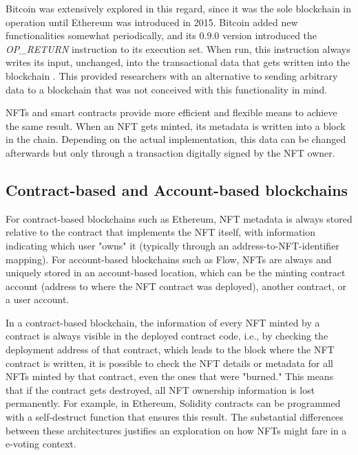 \documentclass[../main.tex]{subfiles}
\begin{document}
\par
Bitcoin was extensively explored in this regard, since it was the sole blockchain in operation until Ethereum was introduced in 2015. Bitcoin added new functionalities somewhat periodically, and its $ 0.9.0 $ version introduced the \textit{OP\_RETURN} instruction to its execution set. When run, this instruction always writes its input, unchanged, into the transactional data that gets written into the blockchain \cite{Bartoletti2017}. This provided researchers with an alternative to sending arbitrary data to a blockchain that was not conceived with this functionality in mind.
\par
NFTs and smart contracts provide more efficient and flexible means to achieve the same result. When an NFT gets minted, its metadata is written into a block in the chain. Depending on the actual implementation, this data can be changed afterwards but only through a transaction digitally signed by the NFT owner.

\subsection{Contract-based and Account-based blockchains}
\label{sec:contract-to-account-storage}
For contract-based blockchains such as Ethereum, NFT metadata is always stored relative to the contract that implements the NFT itself, with information indicating which user "owns" it (typically through an address-to-NFT-identifier mapping). For account-based blockchains such as Flow, NFTs are always and uniquely stored in an account-based location, which can be the minting contract account (address to where the NFT contract was deployed), another contract, or a user account.
\par
In a contract-based blockchain, the information of every NFT minted by a contract is always visible in the deployed contract code, i.e., by checking the deployment address of that contract, which leads to the block where the NFT contract is written, it is possible to check the NFT details or metadata for all NFTs minted by that contract, even the ones that were "burned." This means that if the contract gets destroyed, all NFT ownership information is lost permanently. For example, in Ethereum, Solidity contracts can be programmed with a self-destruct function that ensures this result. The substantial differences between these architectures justifies an exploration on how NFTs might fare in a e-voting context.
\end{document}
